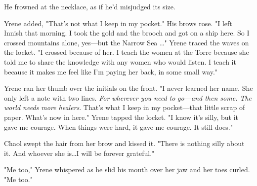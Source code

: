 He frowned at the necklace, as if he'd misjudged its size.

Yrene added, "That's not what I keep in my pocket."
His brows rose.
"I left Innish that morning.
I took the gold and the brooch and got on a ship here.
So I crossed mountains alone, yes---but the Narrow Sea \ldots" Yrene traced the waves on the locket.
"I crossed because of her.
I teach the women at the Torre because she told me to share the knowledge with any women who would listen.
I teach it because it makes me feel like I'm paying her back, in some small way."

Yrene ran her thumb over the initials on the front.
"I never learned her name.
She only left a note with two lines.
\emph{For wherever you need to} \emph{go---and then some.
The world needs more healers}.
That's what I keep in my pocket---that little scrap of paper.
What's now in here."
Yrene tapped the locket.
"I know it's silly, but it gave me courage.
When things were hard, it gave me courage.
It still does."

Chaol swept the hair from her brow and kissed it.
"There is nothing silly about it.
And whoever she is\ldots I will be forever grateful."

"Me too," Yrene whispered as he slid his mouth over her jaw and her toes curled.
"Me too."

